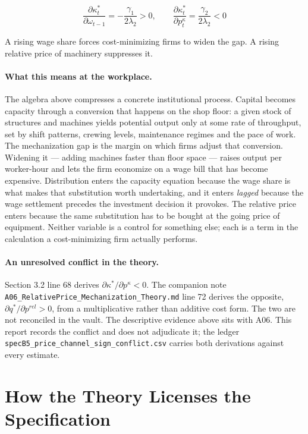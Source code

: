 \documentclass[11pt,a4paper]{article}
\begin{document}
\begin{equation}
\frac{\partial \kappa_t^{*}}{\partial \omega_{t-1}} = -\frac{\gamma_1}{2\lambda_2} > 0, \qquad \frac{\partial \kappa_t^{*}}{\partial p^{\kappa}_t} = \frac{\gamma_2}{2\lambda_2} < 0
\end{equation}

A rising wage share forces cost-minimizing firms to widen the gap. A rising relative price of machinery suppresses it.

\paragraph{What this means at the workplace.} The algebra above compresses a concrete institutional process. Capital becomes capacity through a conversion that happens on the shop floor: a given stock of structures and machines yields potential output only at some rate of throughput, set by shift patterns, crewing levels, maintenance regimes and the pace of work. The mechanization gap is the margin on which firms adjust that conversion. Widening it --- adding machines faster than floor space --- raises output per worker-hour and lets the firm economize on a wage bill that has become expensive. Distribution enters the capacity equation because the wage share is what makes that substitution worth undertaking, and it enters \textit{lagged} because the wage settlement precedes the investment decision it provokes. The relative price enters because the same substitution has to be bought at the going price of equipment. Neither variable is a control for something else; each is a term in the calculation a cost-minimizing firm actually performs.

\paragraph{An unresolved conflict in the theory.} Section 3.2 line 68 derives $\partial\kappa^{*}/\partial p^{\kappa} < 0$. The companion note \texttt{A06\_RelativePrice\_Mechanization\_Theory.md} line 72 derives the opposite, $\partial q^{*}/\partial p^{rel} > 0$, from a multiplicative rather than additive cost form. The two are not reconciled in the vault. The descriptive evidence above sits with A06. This report records the conflict and does not adjudicate it; the ledger \texttt{specB5\_price\_channel\_sign\_conflict.csv} carries both derivations against every estimate.

\FloatBarrier
\section{How the Theory Licenses the Specification}
\end{document}
